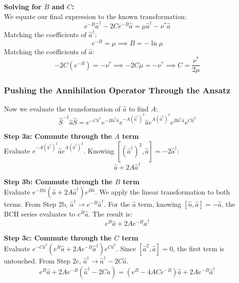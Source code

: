 {\textbf{Solving for $B$ and $C$:} \\
We equate our final expression to the known transformation:
\begin{equation*}
e^{-B}\hat{a}^\dagger - 2Ce^{-B}\hat{a} = \mu\hat{a}^\dagger - \nu^*\hat{a}
\end{equation*}
Matching the coefficients of $\hat{a}^\dagger$: 
\begin{equation*}
e^{-B} = \mu \implies B = -\ln\mu
\end{equation*}
Matching the coefficients of $\hat{a}$:
\begin{equation*}
-2C(e^{-B}) = -\nu^* \implies -2C\mu = -\nu^* \implies C = \frac{\nu^*}{2\mu}
\end{equation*}

\subsubsection{Pushing the Annihilation Operator Through the Ansatz}
Now we evaluate the transformation of $\hat{a}$ to find $A$:
\begin{equation*}
\hat{S}^{-1} \hat{a} \hat{S} = e^{-C\hat{a}^2} e^{-B\hat{a}^\dagger\hat{a}} e^{-A(\hat{a}^\dagger)^2} \hat{a} e^{A(\hat{a}^\dagger)^2} e^{B\hat{a}^\dagger\hat{a}} e^{C\hat{a}^2}
\end{equation*}

\textbf{Step 3a: Commute through the $A$ term} \\
Evaluate $e^{-A(\hat{a}^\dagger)^2} \hat{a} e^{A(\hat{a}^\dagger)^2}$. Knowing $[(\hat{a}^\dagger)^2, \hat{a}] = -2\hat{a}^\dagger$:
\begin{equation*}
\hat{a} + 2A\hat{a}^\dagger
\end{equation*}

\textbf{Step 3b: Commute through the $B$ term} \\
Evaluate $e^{-B\hat{n}} (\hat{a} + 2A\hat{a}^\dagger) e^{B\hat{n}}$. We apply the linear transformation to both terms. From Step 2b, $\hat{a}^\dagger \rightarrow e^{-B}\hat{a}^\dagger$. For the $\hat{a}$ term, knowing $[\hat{n}, \hat{a}] = -\hat{a}$, the BCH series evaluates to $e^B\hat{a}$. The result is:
\begin{equation*}
e^B\hat{a} + 2Ae^{-B}\hat{a}^\dagger
\end{equation*}

\textbf{Step 3c: Commute through the $C$ term} \\
Evaluate $e^{-C\hat{a}^2} (e^B\hat{a} + 2Ae^{-B}\hat{a}^\dagger) e^{C\hat{a}^2}$. Since $[\hat{a}^2, \hat{a}] = 0$, the first term is untouched. From Step 2c, $\hat{a}^\dagger \rightarrow \hat{a}^\dagger - 2C\hat{a}$.
\begin{equation*}
e^B\hat{a} + 2Ae^{-B}(\hat{a}^\dagger - 2C\hat{a}) = (e^B - 4ACe^{-B})\hat{a} + 2Ae^{-B}\hat{a}^\dagger
\end{equation*}

}
